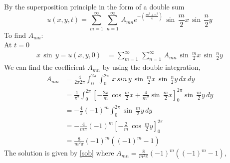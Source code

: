 By the superposition principle  in the form of a double sum
\begin{equation}
u(x,y,t)=\sum_{m=1}^\infty\,\sum_{n=1}^\infty\,A_{mn}e^{-(\frac{m^2+n^2}{4})}\,\sin\,\frac{m}{2}x\,\sin\,\frac{n}{2}y\label{sob}
\end{equation}
To find $A_{mn}$:\\
At $t=0$
\begin{align*}
x\,\sin\,y=u(x,y,0)&=\sum_{m=1}^\infty\,\sum_{n=1}^\infty\,A_{mn}\,\sin\,\frac{m}{2}x\,\sin\,\frac{n}{2}y
\end{align*}
We can find the coefficient $A_{mn}$ by using the double integration,
\begin{align*}
A_{mn}&=\frac{4}{2\pi 2\pi}\int_0^{2\pi}\int_0^{2\pi}\,x\,sin\,y\,\sin\,\frac{m}{2}x\,\sin\,\frac{n}{2}y\,dx\,dy\\
&=\frac{1}{\pi^2}\int_0^{2\pi}\left[-\frac{2x}{m}\,\cos\,\frac{m}{2}x+\frac{4}{m^2}\sin\,\frac{m}{2}x\right]_0^{2\pi}\sin\,\frac{m}{2}y\,dy\\
&=-\frac{4}{\pi}(-1)^m\int_0^{2\pi}\sin\,\frac{m}{2}y\,dy\\
&=-\frac{4}{m\pi}(-1)^m\left[-\frac{2}{m}\,\cos\,\frac{m}{2}y\right]_0^{2\pi}\\
&=\frac{8}{m^2\pi}(-1)^m((-1)^m-1)
\end{align*}
The solution is given by \eqref{sob} where $A_{mn}=\frac{8}{m^2\pi}(-1)^m((-1)^m-1)$,
